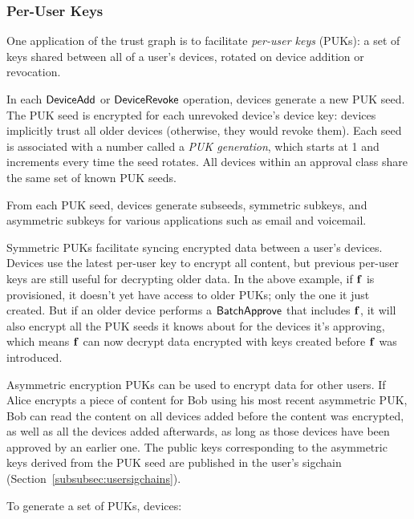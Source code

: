 \subsubsection{Per-User Keys}
\label{subsubsec:puks}

One application of the trust graph is to facilitate \textit{per-user keys} (PUKs): a set of keys
shared between all of a user's devices, rotated on device addition or revocation.

In each $\mathsf{DeviceAdd}{}$ or $\mathsf{DeviceRevoke}{}$ operation, devices generate a new PUK seed. The PUK seed
is encrypted for each unrevoked device's device key: devices implicitly trust all older devices
(otherwise, they would revoke them). Each seed is associated with a number called a \textit{PUK
generation}, which starts at 1 and increments every time the seed rotates. All devices within an
approval class share the same set of known PUK seeds.

From each PUK seed, devices generate subseeds, symmetric subkeys, and asymmetric subkeys for various
applications such as email and voicemail.

Symmetric PUKs facilitate syncing encrypted data between a user's devices. Devices use the latest
per-user key to encrypt all content, but previous per-user keys are still useful for decrypting
older data. In the above example, if $\mathbf{f}$ is provisioned, it doesn't yet have access to older
PUKs; only the one it just created. But if an older device performs a $\mathsf{BatchApprove}{}$ that
includes $\mathbf{f}$, it will also encrypt all the PUK seeds it knows about for the devices it's
approving, which means $\mathbf{f}$ can now decrypt data encrypted with keys created before $\mathbf{f}$
was introduced.

Asymmetric encryption PUKs can be used to encrypt data for other users. If Alice encrypts a piece of
content for Bob using his most recent asymmetric PUK, Bob can read the content on all devices added
before the content was encrypted, as well as all the devices added afterwards, as long as those
devices have been approved by an earlier one. The public keys corresponding to the asymmetric keys
derived from the PUK seed are published in the user's sigchain
(Section~\ref{subsubsec:usersigchains}).

To generate a set of PUKs, devices:

